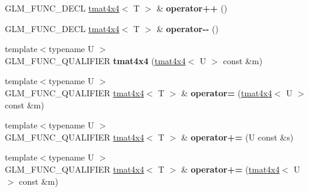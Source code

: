 \begin{DoxyCompactItemize}
\item 
\hypertarget{structglm_1_1detail_1_1tmat4x4_aefaf1ee62f13e648094f42e1611fca9b}{}G\+L\+M\+\_\+\+F\+U\+N\+C\+\_\+\+D\+E\+C\+L \hyperlink{structglm_1_1detail_1_1tmat4x4}{tmat4x4}$<$ T $>$ \& {\bfseries operator++} ()\label{structglm_1_1detail_1_1tmat4x4_aefaf1ee62f13e648094f42e1611fca9b}

\item 
\hypertarget{structglm_1_1detail_1_1tmat4x4_a1066ea037bd5c24e8c6fdf194a76e463}{}G\+L\+M\+\_\+\+F\+U\+N\+C\+\_\+\+D\+E\+C\+L \hyperlink{structglm_1_1detail_1_1tmat4x4}{tmat4x4}$<$ T $>$ \& {\bfseries operator-\/-\/} ()\label{structglm_1_1detail_1_1tmat4x4_a1066ea037bd5c24e8c6fdf194a76e463}

\item 
\hypertarget{structglm_1_1detail_1_1tmat4x4_a2ddeeee14f3dd1e5c521512dc8051e3f}{}{\footnotesize template$<$typename U $>$ }\\G\+L\+M\+\_\+\+F\+U\+N\+C\+\_\+\+Q\+U\+A\+L\+I\+F\+I\+E\+R {\bfseries tmat4x4} (\hyperlink{structglm_1_1detail_1_1tmat4x4}{tmat4x4}$<$ U $>$ const \&m)\label{structglm_1_1detail_1_1tmat4x4_a2ddeeee14f3dd1e5c521512dc8051e3f}

\item 
\hypertarget{structglm_1_1detail_1_1tmat4x4_ab97d240d34aa87e20893cc5ddf07c26f}{}{\footnotesize template$<$typename U $>$ }\\G\+L\+M\+\_\+\+F\+U\+N\+C\+\_\+\+Q\+U\+A\+L\+I\+F\+I\+E\+R \hyperlink{structglm_1_1detail_1_1tmat4x4}{tmat4x4}$<$ T $>$ \& {\bfseries operator=} (\hyperlink{structglm_1_1detail_1_1tmat4x4}{tmat4x4}$<$ U $>$ const \&m)\label{structglm_1_1detail_1_1tmat4x4_ab97d240d34aa87e20893cc5ddf07c26f}

\item 
\hypertarget{structglm_1_1detail_1_1tmat4x4_a96cccd5229d378631d6d476763d94611}{}{\footnotesize template$<$typename U $>$ }\\G\+L\+M\+\_\+\+F\+U\+N\+C\+\_\+\+Q\+U\+A\+L\+I\+F\+I\+E\+R \hyperlink{structglm_1_1detail_1_1tmat4x4}{tmat4x4}$<$ T $>$ \& {\bfseries operator+=} (U const \&s)\label{structglm_1_1detail_1_1tmat4x4_a96cccd5229d378631d6d476763d94611}

\item 
\hypertarget{structglm_1_1detail_1_1tmat4x4_a4aec7f20e371dc5b2b606a51d95ce09d}{}{\footnotesize template$<$typename U $>$ }\\G\+L\+M\+\_\+\+F\+U\+N\+C\+\_\+\+Q\+U\+A\+L\+I\+F\+I\+E\+R \hyperlink{structglm_1_1detail_1_1tmat4x4}{tmat4x4}$<$ T $>$ \& {\bfseries operator+=} (\hyperlink{structglm_1_1detail_1_1tmat4x4}{tmat4x4}$<$ U $>$ const \&m)\label{structglm_1_1detail_1_1tmat4x4_a4aec7f20e371dc5b2b606a51d95ce09d}


\end{DoxyCompactItemize}
